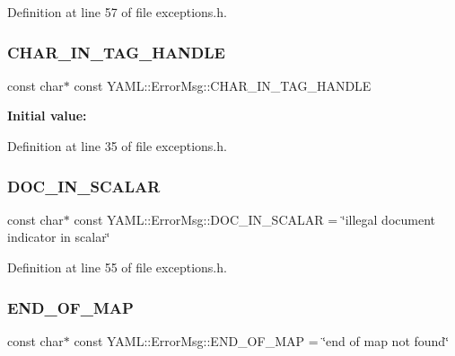 Definition at line 57 of file exceptions.\+h.

\mbox{\label{namespace_y_a_m_l_1_1_error_msg_a3b005e55aa1f024e0426314db76aeb5e}} 
\subsubsection{\texorpdfstring{CHAR\_IN\_TAG\_HANDLE}{CHAR\_IN\_TAG\_HANDLE}}
{\footnotesize\ttfamily const char$\ast$ const Y\+A\+M\+L\+::\+Error\+Msg\+::\+C\+H\+A\+R\+\_\+\+I\+N\+\_\+\+T\+A\+G\+\_\+\+H\+A\+N\+D\+LE}

{\bfseries Initial value\+:}
\begin{DoxyCode}{0}
\DoxyCodeLine{=}
\DoxyCodeLine{    \textcolor{stringliteral}{"illegal character found while scanning tag handle"}}

\end{DoxyCode}


Definition at line 35 of file exceptions.\+h.

\mbox{\label{namespace_y_a_m_l_1_1_error_msg_aa443defd689a9a069efdd44392253d13}} 
\subsubsection{\texorpdfstring{DOC\_IN\_SCALAR}{DOC\_IN\_SCALAR}}
{\footnotesize\ttfamily const char$\ast$ const Y\+A\+M\+L\+::\+Error\+Msg\+::\+D\+O\+C\+\_\+\+I\+N\+\_\+\+S\+C\+A\+L\+AR = \char`\"{}illegal document indicator in scalar\char`\"{}}



Definition at line 55 of file exceptions.\+h.

\mbox{\label{namespace_y_a_m_l_1_1_error_msg_aca2bc86288e21315bcea4856429be3cc}} 
\subsubsection{\texorpdfstring{END\_OF\_MAP}{END\_OF\_MAP}}
{\footnotesize\ttfamily const char$\ast$ const Y\+A\+M\+L\+::\+Error\+Msg\+::\+E\+N\+D\+\_\+\+O\+F\+\_\+\+M\+AP = \char`\"{}end of map not found\char`\"{}}



